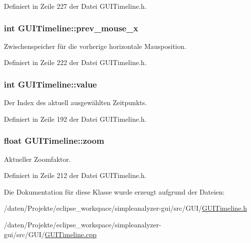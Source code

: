Definiert in Zeile 227 der Datei G\-U\-I\-Timeline.\-h.

\hypertarget{classGUITimeline_a16d456832948e97e9364856f92d97f5c}{
\subsubsection[{prev\-\_\-mouse\-\_\-x}]{\setlength{\rightskip}{0pt plus 5cm}int G\-U\-I\-Timeline\-::prev\-\_\-mouse\-\_\-x\hspace{0.3cm}{\ttfamily [private]}}}\label{classGUITimeline_a16d456832948e97e9364856f92d97f5c}


Zwischenspeicher für die vorherige horizontale Mausposition. 



Definiert in Zeile 222 der Datei G\-U\-I\-Timeline.\-h.

\hypertarget{classGUITimeline_a0ba036e4a58176c5e868662510717ae2}{
\subsubsection[{value}]{\setlength{\rightskip}{0pt plus 5cm}int G\-U\-I\-Timeline\-::value\hspace{0.3cm}{\ttfamily [private]}}}\label{classGUITimeline_a0ba036e4a58176c5e868662510717ae2}


Der Index des aktuell ausgewählten Zeitpunkts. 



Definiert in Zeile 192 der Datei G\-U\-I\-Timeline.\-h.

\hypertarget{classGUITimeline_a9b5b63103a41b6e661cfb30acfcda448}{
\subsubsection[{zoom}]{\setlength{\rightskip}{0pt plus 5cm}float G\-U\-I\-Timeline\-::zoom\hspace{0.3cm}{\ttfamily [private]}}}\label{classGUITimeline_a9b5b63103a41b6e661cfb30acfcda448}


Aktueller Zoomfaktor. 



Definiert in Zeile 212 der Datei G\-U\-I\-Timeline.\-h.



Die Dokumentation für diese Klasse wurde erzeugt aufgrund der Dateien\-:\begin{DoxyCompactItemize}
\item 
/daten/\-Projekte/eclipse\-\_\-workspace/simpleanalyzer-\/gui/src/\-G\-U\-I/\hyperlink{GUITimeline_8h}{G\-U\-I\-Timeline.\-h}\item 
/daten/\-Projekte/eclipse\-\_\-workspace/simpleanalyzer-\/gui/src/\-G\-U\-I/\hyperlink{GUITimeline_8cpp}{G\-U\-I\-Timeline.\-cpp}\end{DoxyCompactItemize}
